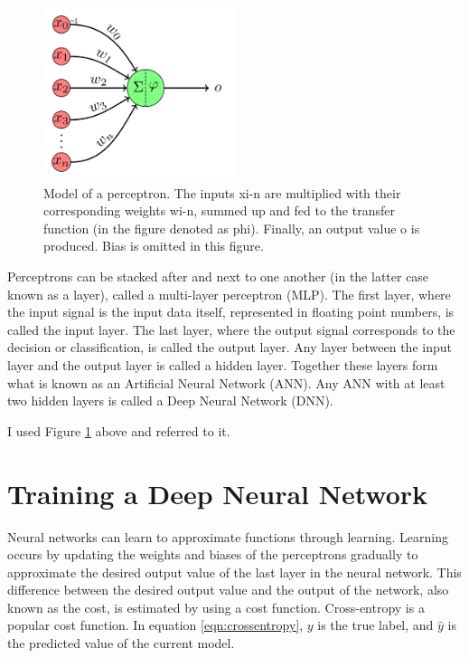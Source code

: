 \documentclass[english, bibtex]{kththesis}
\begin{document}
\begin{figure}[H]
  \begin{center}
    \includegraphics[width=0.5\textwidth]{figures/perceptron.png}
  \end{center}
  \caption{Model of a perceptron. The inputs xi-n are multiplied with their corresponding weights wi-n, summed up and fed to the transfer function (in the figure denoted as phi). Finally, an output value o is produced. Bias is omitted in this figure.}
  \label{fig:perceptron}
\end{figure}

Perceptrons can be stacked after and next to one another (in the latter case known as a layer), called a multi-layer perceptron (MLP). The first layer, where the input signal is the input data itself, represented in floating point numbers, is called the input layer. The last layer, where the output signal corresponds to the decision or classification, is called the output layer. Any layer between the input layer and the output layer is called a hidden layer. Together these layers form what is known as an Artificial Neural Network (ANN). Any ANN with at least two hidden layers is called a Deep Neural Network (DNN).

I used Figure \ref{fig:perceptron} above and referred to it.


\section{Training a Deep Neural Network}

Neural networks can learn to approximate functions through learning. Learning occurs by updating the weights and biases of the perceptrons gradually to approximate the desired output value of the last layer in the neural network. This difference between the desired output value and the output of the network, also known as the cost, is estimated by using a cost function. Cross-entropy is a popular cost function. In equation \ref{eqn:crossentropy}, \(y\) is the true label, and \(\hat{y}\) is the predicted value of the current model.
\end{document}
